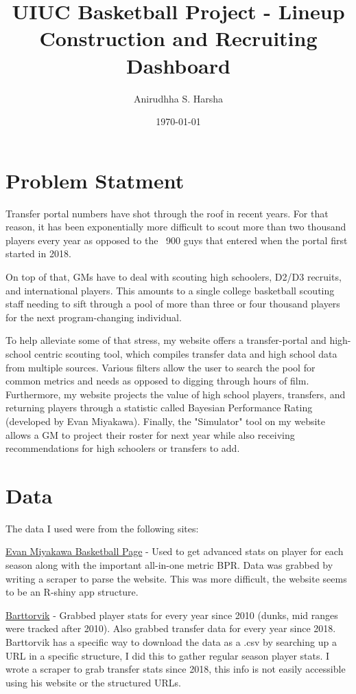\documentclass[11pt]{article}
\title{\textbf{UIUC Basketball Project - Lineup Construction and Recruiting Dashboard}}
\author{Anirudhha S. Harsha}
\date{\today}
\begin{document}
\maketitle

\section{Problem Statment}

Transfer portal numbers have shot through the roof in recent years. For that reason, it has been exponentially more difficult to scout more than two thousand players every year as opposed to the ~900 guys that entered when the portal first started in 2018.

On top of that, GMs have to deal with scouting high schoolers, D2/D3 recruits, and international players. This amounts to a single college basketball scouting staff needing to sift through a pool of more than three or four thousand players for the next program-changing individual.

To help alleviate some of that stress, my website offers a transfer-portal and high-school centric scouting tool, which compiles transfer data and high school data from multiple sources. Various filters allow the user to search the pool for common metrics and needs as opposed to digging through hours of film. Furthermore, my website projects the value of high school players, transfers, and returning players through a statistic called Bayesian Performance Rating (developed by Evan Miyakawa). Finally, the "Simulator" tool on my website allows a GM to project their roster for next year while also receiving recommendations for high schoolers or transfers to add.

\section{Data}

The data I used were from the following sites:

\href{https://evanmiya.com}{Evan Miyakawa Basketball Page} - Used to get advanced stats on player for each season along with the important all-in-one metric BPR. Data was grabbed by writing a scraper to parse the website. This was more difficult, the website seems to be an R-shiny app structure.

\href{https://barttorvik.com/#}{Barttorvik} - Grabbed player stats for every year since 2010 (dunks, mid ranges were tracked after 2010). Also grabbed transfer data for every year since 2018. Barttorvik has a specific way to download the data as a .csv by searching up a URL in a specific structure, I did this to gather regular season player stats. I wrote a scraper to grab transfer stats since 2018, this info is not easily accessible using his website or the structured URLs.
\end{document}
